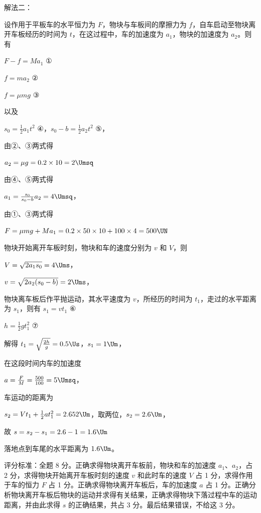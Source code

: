 \documentclass[\gkver]{gaokaozhenti}
\begin{document}
\begin{enumerate}
{解法二：

设作用于平板车的水平恒力为 $F$，物块与车板间的摩擦力为 $f$，自车启动至物块离开车板经历的时间为 $t$，在这过程中，车的加速度为 $a_{1}$，物块的加速度为 $a_{2}$。则有

$F-f=Ma_{1}$ ①

$f=ma_{2}$ ②

$f=\mu mg$ ③

以及

$s_{0}=\frac{1}{2}a_{1}t^{2}$ ④，$s_{0}-b=\frac{1}{2}a_{2}t^{2}$ ⑤，

由②、③两式得

$a_{2}=\mu g=0.2\times10=2\Umsq$

由④、⑤两式得

$a_{1}=\frac{s_{0}}{s_{0}-b}a_{2}=4\Umsq$，

由①、③两式得

$F=\mu mg+Ma_{1}=0.2\times50\times10+100\times4=500\UN$

物块开始离开车板时刻，物块和车的速度分别为 $v$ 和 $V$，则

$V=\sqrt{2a_{1}s_{0}}=4\Ums$，

$v=\sqrt{2a_{2}(s_{0}-b)}=2\Ums$，

物块离车板后作平抛运动，其水平速度为 $v$，所经历的时间为 $t_{1}$，走过的水平距离为 $s_{1}$，则有 $s_{1}=vt_{1}$ ⑥

$h=\frac{1}{2}gt_{1}^{2}$ ⑦

解得 $t_{1}=\sqrt{\frac{2h}{g}}=0.5\Us$，$s_{1}=1\Um$，

在这段时间内车的加速度

$a=\frac{F}{M}=\frac{500}{100}=5\Umsq$，

车运动的距离为

$s_{2}=Vt_{1}+\frac{1}{2}at_{1}^{2}=2.652\Um$，取两位，$s_{2}=2.6\Um$，

故 $s=s_{2}-s_{1}=2.6-1=1.6\Um$

落地点到车尾的水平距离为 $1.6\Um$。

评分标准：全题 8 分。正确求得物块离开车板前，物块和车的加速度 $a_{1}$、$a_{2}$，占 2 分，求得物块开始离开车板时刻的速度 $v$ 和此时车的速度 $V$ 占 1 分，求得作用于车的恒力 $F$ 占 1 分。正确求得物块离开车板后，车的加速度 $a$ 占 1 分。正确分析物块离开车板后物块的运动并求得有关结果，正确求得物块下落过程中车的运动距离，并由此求得 $s$ 的正确结果，共占 3 分。最后结果错误，不给这 3 分。
}

\end{enumerate}
\end{document}
